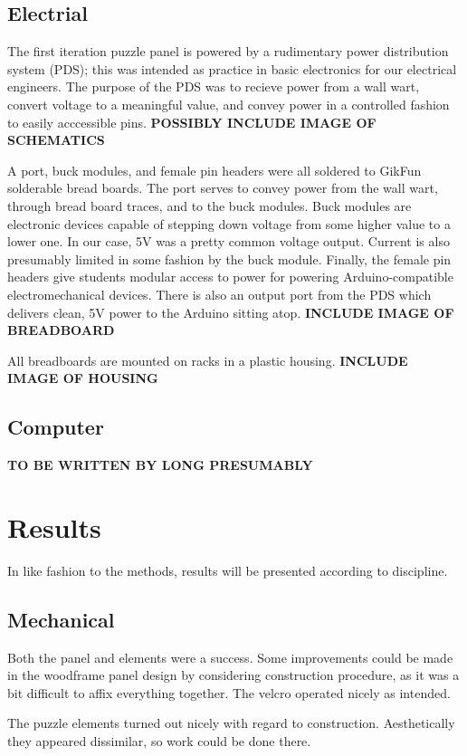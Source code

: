\documentclass[conference]{IEEEtran}
\begin{document}
	\subsection{Electrial}
	The first iteration puzzle panel is powered by a rudimentary power distribution system (PDS); this was intended as practice in basic electronics for our electrical engineers. The purpose of the PDS was to recieve power from a wall wart, convert voltage to a meaningful value, and convey power in a controlled fashion to easily acccessible pins.
	\textbf{POSSIBLY INCLUDE IMAGE OF SCHEMATICS}
	
	A port, buck modules, and female pin headers were all soldered to GikFun solderable bread boards. The port serves to convey power from the wall wart, through bread board traces, and to the buck modules. Buck modules are electronic devices capable of stepping down voltage from some higher value to a lower one. In our case, 5V was a pretty common voltage output. Current is also presumably limited in some fashion by the buck module. Finally, the female pin headers give students modular access to power for powering Arduino-compatible electromechanical devices. There is also an output port from the PDS which delivers clean, 5V power to the Arduino sitting atop. 
	\textbf{INCLUDE IMAGE OF BREADBOARD}
	
	All breadboards are mounted on racks in a plastic housing.
	\textbf{INCLUDE IMAGE OF HOUSING}

	\subsection{Computer}
	\textbf{TO BE WRITTEN BY LONG PRESUMABLY}

\section{Results}
In like fashion to the methods, results will be presented according to discipline.
	\subsection{Mechanical}
	Both the panel and elements were a success. Some improvements could be made in the woodframe panel design by considering construction procedure, as it was a bit difficult to affix everything together. The velcro operated nicely as intended.
	
	The puzzle elements turned out nicely with regard to construction. Aesthetically they appeared dissimilar, so work could be done there.
	
\end{document}
